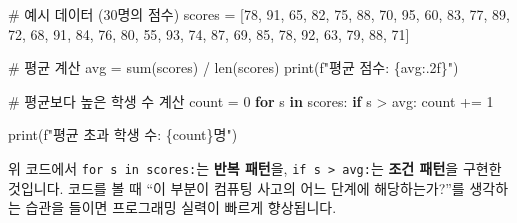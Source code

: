 \documentclass[
  korean,
  11pt,
  a4paper,
  DIV=11,
  numbers=noendperiod]{scrreprt}
\newenvironment{Shaded}{\begin{snugshade}}{\end{snugshade}}
\newcommand{\BuiltInTok}[1]{\textcolor[rgb]{0.00,0.23,0.31}{#1}}
\newcommand{\CommentTok}[1]{\textcolor[rgb]{0.37,0.37,0.37}{#1}}
\newcommand{\ControlFlowTok}[1]{\textcolor[rgb]{0.00,0.23,0.31}{\textbf{#1}}}
\newcommand{\DecValTok}[1]{\textcolor[rgb]{0.68,0.00,0.00}{#1}}
\newcommand{\KeywordTok}[1]{\textcolor[rgb]{0.00,0.23,0.31}{\textbf{#1}}}
\newcommand{\NormalTok}[1]{\textcolor[rgb]{0.00,0.23,0.31}{#1}}
\newcommand{\OperatorTok}[1]{\textcolor[rgb]{0.37,0.37,0.37}{#1}}
\newcommand{\SpecialCharTok}[1]{\textcolor[rgb]{0.37,0.37,0.37}{#1}}
\newcommand{\SpecialStringTok}[1]{\textcolor[rgb]{0.13,0.47,0.30}{#1}}
\begin{document}
\begin{Shaded}
\begin{Highlighting}[]
\CommentTok{\# 예시 데이터 (30명의 점수)}
\NormalTok{scores }\OperatorTok{=}\NormalTok{ [}\DecValTok{78}\NormalTok{, }\DecValTok{91}\NormalTok{, }\DecValTok{65}\NormalTok{, }\DecValTok{82}\NormalTok{, }\DecValTok{75}\NormalTok{, }\DecValTok{88}\NormalTok{, }\DecValTok{70}\NormalTok{, }\DecValTok{95}\NormalTok{, }\DecValTok{60}\NormalTok{, }\DecValTok{83}\NormalTok{,}
          \DecValTok{77}\NormalTok{, }\DecValTok{89}\NormalTok{, }\DecValTok{72}\NormalTok{, }\DecValTok{68}\NormalTok{, }\DecValTok{91}\NormalTok{, }\DecValTok{84}\NormalTok{, }\DecValTok{76}\NormalTok{, }\DecValTok{80}\NormalTok{, }\DecValTok{55}\NormalTok{, }\DecValTok{93}\NormalTok{,}
          \DecValTok{74}\NormalTok{, }\DecValTok{87}\NormalTok{, }\DecValTok{69}\NormalTok{, }\DecValTok{85}\NormalTok{, }\DecValTok{78}\NormalTok{, }\DecValTok{92}\NormalTok{, }\DecValTok{63}\NormalTok{, }\DecValTok{79}\NormalTok{, }\DecValTok{88}\NormalTok{, }\DecValTok{71}\NormalTok{]}

\CommentTok{\# 평균 계산}
\NormalTok{avg }\OperatorTok{=} \BuiltInTok{sum}\NormalTok{(scores) }\OperatorTok{/} \BuiltInTok{len}\NormalTok{(scores)}
\BuiltInTok{print}\NormalTok{(}\SpecialStringTok{f"평균 점수: }\SpecialCharTok{\{}\NormalTok{avg}\SpecialCharTok{:.2f\}}\SpecialStringTok{"}\NormalTok{)}

\CommentTok{\# 평균보다 높은 학생 수 계산}
\NormalTok{count }\OperatorTok{=} \DecValTok{0}
\ControlFlowTok{for}\NormalTok{ s }\KeywordTok{in}\NormalTok{ scores:}
    \ControlFlowTok{if}\NormalTok{ s }\OperatorTok{\textgreater{}}\NormalTok{ avg:}
\NormalTok{        count }\OperatorTok{+=} \DecValTok{1}

\BuiltInTok{print}\NormalTok{(}\SpecialStringTok{f"평균 초과 학생 수: }\SpecialCharTok{\{}\NormalTok{count}\SpecialCharTok{\}}\SpecialStringTok{명"}\NormalTok{)}
\end{Highlighting}
\end{Shaded}

\begin{tcolorbox}[enhanced jigsaw, arc=.35mm, bottomrule=.15mm, bottomtitle=1mm, breakable, colback=white, colbacktitle=quarto-callout-tip-color!10!white, colframe=quarto-callout-tip-color-frame, coltitle=black, left=2mm, leftrule=.75mm, opacityback=0, opacitybacktitle=0.6, rightrule=.15mm, title=\textcolor{quarto-callout-tip-color}{\faLightbulb}\hspace{0.5em}{코드를 보는 관점}, titlerule=0mm, toprule=.15mm, toptitle=1mm]

위 코드에서 \texttt{for\ s\ in\ scores:}는 \textbf{반복 패턴}을,
\texttt{if\ s\ \textgreater{}\ avg:}는 \textbf{조건 패턴}을 구현한
것입니다. 코드를 볼 때 ``이 부분이 컴퓨팅 사고의 어느 단계에
해당하는가?''를 생각하는 습관을 들이면 프로그래밍 실력이 빠르게
향상됩니다.

\end{tcolorbox}
\end{document}
